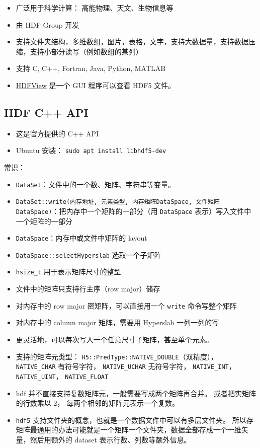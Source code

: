 

\begin{issues}
\issueDraft
\end{issues}

\begin{itemize}
\item 广泛用于科学计算： 高能物理、天文、生物信息等
\item 由 HDF Group 开发
\item 支持文件夹结构，多维数组，图片，表格，文字，支持大数据量，支持数据压缩，支持小部分读写（例如数组的某列）
\item 支持 C, C++, Fortran, Java, Python, MATLAB
\item \href{https://www.hdfgroup.org/downloads/hdfview/}{HDFView} 是一个 GUI 程序可以查看 HDF5 文件。
\end{itemize}

\subsection{HDF C++ API}
\begin{itemize}
\item 这是官方提供的 C++ API
\item Ubuntu 安装： \verb`sudo apt install libhdf5-dev`
\end{itemize}

常识：
\begin{itemize}
\item \verb`DataSet`：文件中的一个数、矩阵、字符串等变量。
\item \verb`DataSet::write(内存地址, 元素类型, 内存矩阵DataSpace, 文件矩阵DataSpace)`：把内存中一个矩阵的一部分（用 \verb`DataSpace` 表示）写入文件中一个矩阵的一部分
\item \verb`DataSpace`：内存中或文件中矩阵的 layout
\item \verb`DataSpace::selectHyperslab` 选取一个子矩阵
\item \verb`hsize_t` 用于表示矩阵尺寸的整型
\item 文件中的矩阵只支持行主序（row major）储存
\item 对内存中的 row major 密矩阵，可以直接用一个 \verb`write` 命令写整个矩阵
\item 对内存中的 column major 矩阵，需要用 Hyperslab 一列一列的写
\item 更灵活地，可以每次写入一个任意尺寸子矩阵，甚至单个元素。
\item 支持的矩阵元类型： \verb`H5::PredType::NATIVE_DOUBLE`（双精度）， \verb`NATIVE_CHAR` 有符号字符， \verb`NATIVE_UCHAR` 无符号字符， \verb`NATIVE_INT`， \verb`NATIVE_UINT`， \verb`NATIVE_FLOAT`
\item hdf 并不直接支持复数矩阵元，一般需要写成两个矩阵再合并。 或者把实矩阵的行数乘以 2， 每两个相邻的矩阵元表示一个复数。
\item \verb`hdf5` 支持文件夹的概念，也就是一个数据文件中可以有多层文件夹。 所以存矩阵最通用的办法可能就是一个矩阵一个文件夹，数据全部存成一个一维矢量，然后用额外的 dataset 表示行数、列数等额外信息。
\end{itemize}


